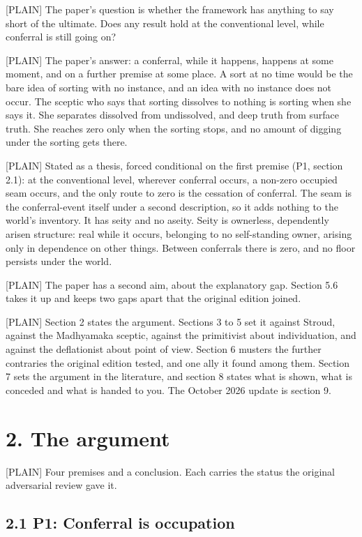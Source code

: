 \documentclass[11pt]{article}
\newcommand{\register}[1]{{\ttfamily\small #1}}
\begin{document}
\register{[PLAIN]} The paper's question is whether the framework has anything to say short of the ultimate. Does any result hold at the conventional level, while conferral is still going on?

\register{[PLAIN]} The paper's answer: a conferral, while it happens, happens at some moment, and on a further premise at some place. A sort at no time would be the bare idea of sorting with no instance, and an idea with no instance does not occur. The sceptic who says that sorting dissolves to nothing is sorting when she says it. She separates dissolved from undissolved, and deep truth from surface truth. She reaches zero only when the sorting stops, and no amount of digging under the sorting gets there.

\register{[PLAIN]} Stated as a thesis, forced conditional on the first premise (P1, section 2.1): at the conventional level, wherever conferral occurs, a non-zero occupied seam occurs, and the only route to zero is the cessation of conferral. The seam is the conferral-event itself under a second description, so it adds nothing to the world's inventory. It has seity and no aseity. Seity is ownerless, dependently arisen structure: real while it occurs, belonging to no self-standing owner, arising only in dependence on other things. Between conferrals there is zero, and no floor persists under the world.

\register{[PLAIN]} The paper has a second aim, about the explanatory gap. Section 5.6 takes it up and keeps two gaps apart that the original edition joined.

\register{[PLAIN]} Section 2 states the argument. Sections 3 to 5 set it against Stroud, against the Madhyamaka sceptic, against the primitivist about individuation, and against the deflationist about point of view. Section 6 musters the further contraries the original edition tested, and one ally it found among them. Section 7 sets the argument in the literature, and section 8 states what is shown, what is conceded and what is handed to you. The October 2026 update is section 9.

\section*{2. The argument}

\register{[PLAIN]} Four premises and a conclusion. Each carries the status the original adversarial review gave it.

\subsection*{2.1 P1: Conferral is occupation}
\end{document}
